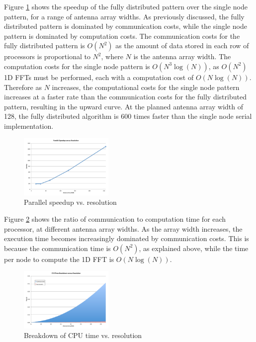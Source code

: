 \documentclass[twocolumn]{article}
\begin{document}
Figure \ref{speedup vs resolution} shows the speedup of the fully distributed pattern over the single node pattern, for a range of antenna array widths. As previously discussed, the fully distributed pattern is dominated by communication costs, while the single node pattern is dominated by computation costs. The communication costs for the fully distributed pattern is $O(N^2)$ as the amount of data stored in each row of processors is proportional to $N^2$, where $N$ is the antenna array width. The computation costs for the single node pattern is $O(N^3 \log(N))$, as $O(N^2)$ 1D FFTs must be performed, each with a computation cost of $O(N\log(N))$. Therefore as $N$ increases, the computational costs for the single node pattern increases at a faster rate than the communication costs for the fully distributed pattern, resulting in the upward curve. At the planned antenna array width of 128, the fully distributed algorithm is 600 times faster than the single node serial implementation.

\begin{figure}[!h]
\centering
\includegraphics*[width=0.4\textwidth]{figures/chart9.pdf}
\caption{Parallel speedup vs. resolution}
\label{speedup vs resolution}
\end{figure}

Figure \ref{cpu breakdown vs resolution} shows the ratio of communication to computation time for each processor, at different antenna array widths. As the array width increases, the execution time becomes increasingly dominated by communication costs. This is because the communication time is $O(N^2)$, as explained above, while the time per node to compute the 1D FFT is $O(N\log(N))$.

\begin{figure}[!h]
\centering
\includegraphics*[width=0.4\textwidth]{figures/chart2.pdf}
\caption{Breakdown of CPU time vs. resolution}
\label{cpu breakdown vs resolution}
\end{figure}
\end{document}

